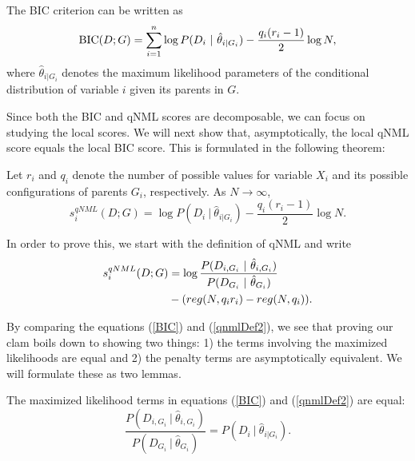 The BIC criterion can be written as
\begin{equation}\label{BIC}
\textnormal{BIC}(D;G) = \sum_{i = 1}^n \log P(D_i \ | \ \hat{\theta}_{i | G_i} ) - \frac{q_i(r_i - 1)}{2} \log N,
\end{equation}
where $\hat{\theta}_{i | G_i}$ denotes the maximum likelihood parameters of
the conditional distribution of variable $i$ given its parents in
$G$. 

Since both the BIC and qNML scores are decomposable, we can focus on
studying the local scores. We will next show that, asymptotically, the
local qNML score equals the local BIC score. This is formulated in the
following theorem:

\begin{theorem}\label{consistency}
Let $r_i$ and $q_i$ denote the number of possible values for variable
$X_i$ and its possible configurations of parents $G_i$,
respectively. As $N \to \infty$,
$$
s^{qNML}_i(D;G) =  \log P(D_i \ | \ \hat{\theta}_{i | G_i} )  - \frac{q_i(r_i - 1)}{2} \log N.
$$
\end{theorem}

In order to prove this, we start with the definition of qNML and write
\begin{align}\label{qnmlDef2}
s^{qNML}_i(D;G) &= \log \frac{P(D_{i, G_i} \ | \ \hat{\theta}_{i, G_i}
  )}{P(D_{G_i} \ | \ \hat{\theta}_{G_i} )} \notag \\ & -(reg(N,q_i
r_i) - reg(N,q_i)).
\end{align}

By comparing the equations (\ref{BIC}) and (\ref{qnmlDef2}), we see
that proving our clam boils down to showing two things: 1) the terms
involving the maximized likelihoods are equal and 2) the penalty terms
are asymptotically equivalent. We will formulate these as two
lemmas.

\begin{lemma}\label{MLLemma} The maximized likelihood terms in equations (\ref{BIC}) and (\ref{qnmlDef2}) are equal:    
$$
\frac{P(D_{i, G_i} \ | \ \hat{\theta}_{i, G_i} )}{P(D_{G_i} \ | \ \hat{\theta}_{G_i} )} = P(D_i \ | \ \hat{\theta}_{i | G_i} ).
$$
\end{lemma}

